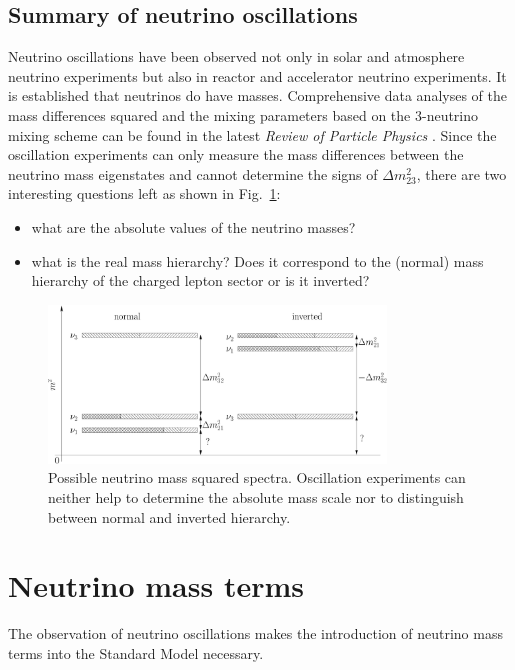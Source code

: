 \subsection{Summary of neutrino oscillations}
\label{sec:allo}
Neutrino oscillations have been observed not only in solar and atmosphere neutrino experiments but also in reactor and accelerator neutrino experiments. It is established that neutrinos do have masses. Comprehensive data analyses of the mass differences squared and the mixing parameters based on the 3-neutrino mixing scheme can be found in the latest \emph{Review of Particle Physics} \cite{PDG08}. Since the oscillation experiments can only measure the mass differences between the neutrino mass eigenstates and cannot determine the signs of $\Delta m^{2}_{23}$, there are two interesting questions left as shown in Fig.~\ref{fig:hie}:
\begin{itemize}
\item what are the absolute values of the neutrino masses?
\item what is the real mass hierarchy? Does it correspond to the   (normal) mass hierarchy of the charged lepton sector or is it   inverted?
\end{itemize}
\begin{figure}[tbhp]
  \centering
  \includegraphics[width=0.8\textwidth]{massHierarchy}  
  \caption{Possible neutrino mass squared spectra. Oscillation     experiments can neither help to determine the absolute mass scale     nor to distinguish between normal and inverted hierarchy.}
  \label{fig:hie}
\end{figure}


\section{Neutrino mass terms}
\label{sec:nema}
The observation of neutrino oscillations makes the introduction of neutrino mass terms into the Standard Model necessary.
